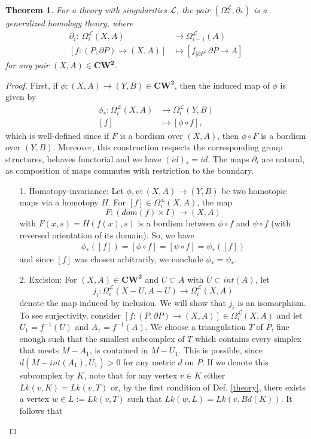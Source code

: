 \documentclass[11pt]{book}
\newtheorem{theorem}{Theorem}
\begin{document}
\begin{theorem}
For a theory with singularities $\mathcal{L}$, the pair $(\Omega_*^{\mathcal{L}}, \partial_*)$ is a generalized homology theory, where 
\begin{align*}
\partial_i :\  \Omega_i^{\mathcal{L}}(X,A) &\to \Omega_{i-1}^{\mathcal{L}}(A) \\
[f: (P, \partial P) \to (X,A)] &\mapsto [f_{| \partial P}: \partial P \to A]
\end{align*}
for any pair $(X,A) \in \boldsymbol{CW^2}$.
\end{theorem}

\begin{proof}
First, if $\phi : (X,A) \to (Y,B) \in \boldsymbol{CW^2}$, then the induced map of $\phi $ is given by
\begin{align*}
\phi_* : \Omega_i^{\mathcal{L}}(X,A) &\to \Omega_i^{\mathcal{L}}(Y,B) \\
[f] &\mapsto [\phi \circ f],
\end{align*}
which is well-defined since if $F$ is a bordism over $(X,A)$, then $\phi \circ F$ is a bordism over $(Y,B)$. Moreover, this construction respects the corresponding group structures, behaves functorial and we have $(id)_*=id$. The maps $\partial_i$ are natural, as composition of maps commutes with restriction to the boundary. 
\begin{itemize}
\item[1.] Homotopy-invariance: Let $\phi, \psi : (X,A) \to (Y,B)$ be two homotopic maps via a homotopy $H$. For $[f] \in \Omega_i^{\mathcal{L}}(X,A)$, the map
\begin{equation*}
F: (dom(f) \times I) \to (X,A) 
\end{equation*}
with $F(x,s)=H(f(x),s)$ is a bordism between $\phi \circ f$ and $\psi \circ f$ (with reversed orientation of its domain). So, we have
\begin{align*}
\phi_* ([f]) = [\phi \circ f] = [\psi \circ f] = \psi_* ([f])
\end{align*}
and since $[f]$ was chosen arbitrarily, we conclude $\phi_*= \psi_*$.
\item[2.] Excision: For $(X,A) \in \boldsymbol{CW^2}$ and $U \subset A$ with $\overline{U} \subset int(A)$, let 
\begin{equation*}
j_i: \Omega_i^{\mathcal{L}}(X-U, A-U) \to \Omega_i^{\mathcal{L}}(X,A)
\end{equation*}
denote the map induced by inclusion. We will show that $j_i$ is an isomorphism. To see surjectivity, consider $[f: (P, \partial P) \to (X,A)] \in \Omega_i^{\mathcal{L}}(X,A)$ and let $U_1 = f^{-1}(U)$ and $A_1= f^{-1}(A)$. We choose a triangulation $T$ of $P$, fine enough such that the smallest subcomplex of $T$ which contains every simplex that meets $M-A_1$, is contained in $M-U_1$. This is possible, since $d(M-int(A_1), \overline{U_1})>0$ for any metric $d$ on $P$. If we denote this subcomplex by $K$, note that for any vertex $v \in K$ either $Lk(v,K)=Lk(v,T)$ or, by the first condition of Def. \ref{theory}, there exists a vertex $w \in L:= Lk(v,T)$ such that $Lk(w,L)=Lk(v,Bd(K))$. It follows that

\end{itemize}
\end{proof}
\end{document}
